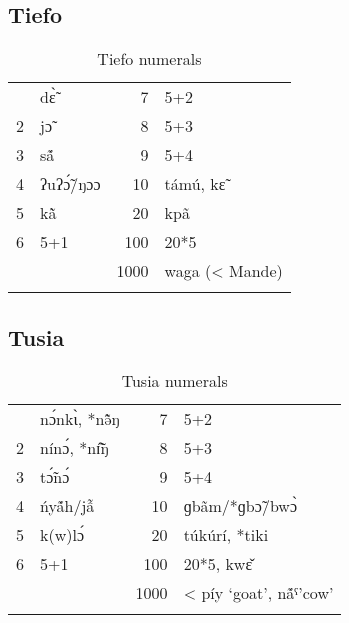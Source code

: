  
\subsection{Tiefo}%
\begin{table}
\caption{\label{tab:3:184}Tiefo numerals}
\begin{tabularx}{\textwidth}{lQrl}
 & d{\`{\~ɛ}} & 7 & 5+2\\
2 & j{\~{ɔ}} & 8 & 5+3\\
3 & s{\'ã} & 9 & 5+4\\
4 & ʔuʔ{\'{\~ɔ}}/ŋɔɔ & 10 & támú, k{\~{ɛ}}~\\
5 & k{\`ã} & 20 & kp{\~{a}}\\
6 & 5+1 & 100 & 20*5\\
&  & 1000 & waga (< Mande)\\
\lspbottomrule
\end{tabularx}
\end{table}

\largerpage[2]

\subsection{Tusia}%
\begin{table}
\caption{\label{tab:3:185}Tusia numerals}
\begin{tabularx}{\textwidth}{lQrl}
 & n{\'{ɔ}}nk{\`{ɩ}}, *n{\~{\^ə}}ŋ & 7 & 5+2\\
2 & nín{\'{ɔ}}, *n{\~{\^ɪ}}ŋ & 8 & 5+3\\
3 & t{\'{\~ɔ}}n{\'{ɔ}} & 9 & 5+4\\
4 & {\'{n}}y{\'ã}h/j{\~{\^a}} & 10 & ɡb{\~{a}}m/*ɡb{\~{ɔ}}/bw{\`{ɔ}}\\
5 & k(w)l{\'{ɔ}} & 20 & túkúrí, *tiki\\
6 & 5+1 & 100 & 20*5, kw{\v{ɛ}}\\
&  & 1000 & < píy `goat’, n{\'ã}ˤ'cow'\\
\lspbottomrule
\end{tabularx}
\end{table}

 \clearpage
